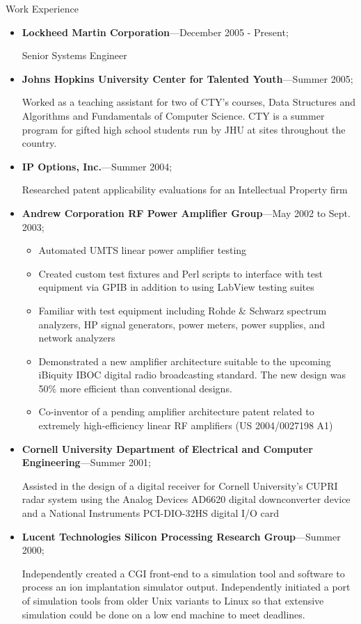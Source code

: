 \documentclass[10pt,oneside]{article}
\newenvironment{ressection}[1]{
	\vspace{4pt}
	{\Large#1}
	\begin{itemize}
	\vspace{3pt}
}{
	\end{itemize}
}
\newcommand{\ressubitem}[1]{
	\vspace{-1pt}
	\item \begin{flushleft} #1 \end{flushleft}
}
\newcommand{\resbigitem}[3]{
	\vspace{-5pt}
	\item
	\textbf{#1}---#2; \quad \textit{#3}
}
\newenvironment{ressubsec}[3]{
	\resbigitem{#1}{#2}{#3}
	\vspace{-2pt}
	\begin{itemize}
}{
	\end{itemize}
}
\newenvironment{ressection}[1]{
	\vspace{4pt}
	{\fontfamily{phv}\selectfont\Large#1}
	\begin{itemize}
	\vspace{3pt}
}{
	\end{itemize}
}
\newcommand{\ressubitem}[1]{
	\vspace{-1pt}
	\item \begin{flushleft} #1 \end{flushleft}
}
\newcommand{\resbigitem}[2]{
	\vspace{-5pt}
	\item
	\textbf{#1}---\textit{#2}
}
\newenvironment{ressubsec}[2]{
	\resbigitem{#1}{#2}
	\vspace{-2pt}
	\begin{itemize}
}{
	\end{itemize}
}
\begin{document}
\begin{ressection}{Work Experience}

	\begin{ressubsec}{Lockheed Martin Corporation}{December 2005 - Present}
		\ressubitem{Senior Systems Engineer}
	\end {ressubsec}

	\begin{ressubsec}{Johns Hopkins University Center for Talented Youth}{Summer 2005}
		\ressubitem{Worked as a teaching assistant for two of CTY's courses, Data Structures and Algorithms and Fundamentals of Computer Science.  CTY is a summer program for gifted high school students run by JHU at sites throughout the country.}
	\end{ressubsec}

	\begin{ressubsec}{IP Options, Inc.}{Summer 2004}
		\ressubitem{Researched patent applicability evaluations for an Intellectual Property firm}
	\end{ressubsec}

	\begin{ressubsec}{Andrew Corporation RF Power Amplifier Group}{May 2002 to Sept. 2003}
		\ressubitem{Developed new amplifier architectures}
	        \ressubitem{Automated UMTS linear power amplifier testing}
		\ressubitem{Created custom test fixtures and Perl scripts to interface with test equipment via GPIB in addition to using LabView testing suites}
		\ressubitem{Familiar with test equipment including Rohde \& Schwarz spectrum analyzers, HP signal generators, power meters, power supplies, and network analyzers}
		\ressubitem{Demonstrated a new amplifier architecture suitable to the upcoming iBiquity IBOC digital radio broadcasting standard. The new design was 50\% more efficient than conventional designs.}
		\ressubitem{Co-inventor of a pending amplifier architecture patent related to extremely high-efficiency linear RF amplifiers (US 2004/0027198 A1)}
	\end{ressubsec}

	\begin{ressubsec}{Cornell University Department of Electrical and Computer Engineering}{Summer 2001}
		\ressubitem{Assisted in the design of a digital receiver for Cornell University's CUPRI radar system using the Analog Devices AD6620 digital downconverter device and a National Instruments PCI-DIO-32HS digital I/O card}
	\end{ressubsec}

	\begin{ressubsec}{Lucent Technologies Silicon Processing Research Group}{Summer 2000}
		\ressubitem{Independently created a CGI front-end to a simulation tool and software to process an ion implantation simulator output. Independently initiated a port of simulation tools from older Unix variants to Linux so that extensive simulation could be done on a low end machine to meet deadlines.}
	\end{ressubsec}


\end{ressection}
\end{document}
